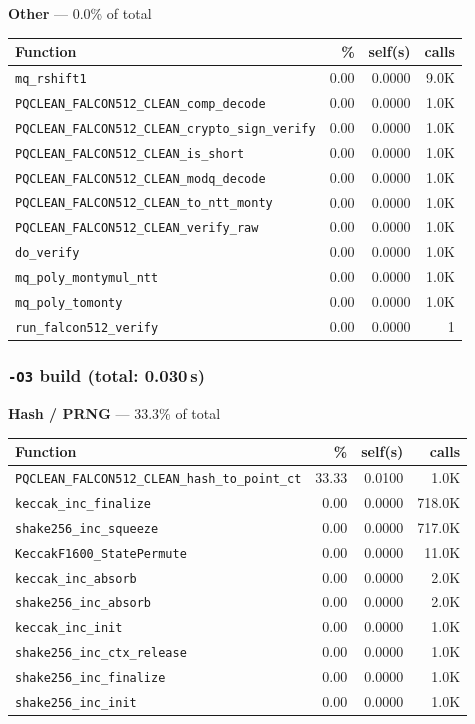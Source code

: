 \documentclass[11pt,a4paper]{article}
\begin{document}
\noindent\colorbox{othercolor}{\strut \textbf{Other} --- 0.0\% of total}
\vspace{2pt}

\begin{longtable}{p{7.5cm}rrr}
\toprule
Function & \% & self(s) & calls \\
\midrule
\endhead
  \texttt{mq\_rshift1} & 0.00 & 0.0000 & 9.0K \\
  \texttt{PQCLEAN\_FALCON512\_CLEAN\_comp\_decode} & 0.00 & 0.0000 & 1.0K \\
  \texttt{PQCLEAN\_FALCON512\_CLEAN\_crypto\_sign\_verify} & 0.00 & 0.0000 & 1.0K \\
  \texttt{PQCLEAN\_FALCON512\_CLEAN\_is\_short} & 0.00 & 0.0000 & 1.0K \\
  \texttt{PQCLEAN\_FALCON512\_CLEAN\_modq\_decode} & 0.00 & 0.0000 & 1.0K \\
  \texttt{PQCLEAN\_FALCON512\_CLEAN\_to\_ntt\_monty} & 0.00 & 0.0000 & 1.0K \\
  \texttt{PQCLEAN\_FALCON512\_CLEAN\_verify\_raw} & 0.00 & 0.0000 & 1.0K \\
  \texttt{do\_verify} & 0.00 & 0.0000 & 1.0K \\
  \texttt{mq\_poly\_montymul\_ntt} & 0.00 & 0.0000 & 1.0K \\
  \texttt{mq\_poly\_tomonty} & 0.00 & 0.0000 & 1.0K \\
  \texttt{run\_falcon512\_verify} & 0.00 & 0.0000 & 1 \\
\bottomrule
\end{longtable}

\subsubsection*{\texttt{-O3} build (total: 0.030\,s)}

\noindent\colorbox{hashcolor}{\strut \textbf{Hash / PRNG} --- 33.3\% of total}
\vspace{2pt}

\begin{longtable}{p{7.5cm}rrr}
\toprule
Function & \% & self(s) & calls \\
\midrule
\endhead
  \texttt{PQCLEAN\_FALCON512\_CLEAN\_hash\_to\_point\_ct} & 33.33 & 0.0100 & 1.0K \\
  \texttt{keccak\_inc\_finalize} & 0.00 & 0.0000 & 718.0K \\
  \texttt{shake256\_inc\_squeeze} & 0.00 & 0.0000 & 717.0K \\
  \texttt{KeccakF1600\_StatePermute} & 0.00 & 0.0000 & 11.0K \\
  \texttt{keccak\_inc\_absorb} & 0.00 & 0.0000 & 2.0K \\
  \texttt{shake256\_inc\_absorb} & 0.00 & 0.0000 & 2.0K \\
  \texttt{keccak\_inc\_init} & 0.00 & 0.0000 & 1.0K \\
  \texttt{shake256\_inc\_ctx\_release} & 0.00 & 0.0000 & 1.0K \\
  \texttt{shake256\_inc\_finalize} & 0.00 & 0.0000 & 1.0K \\
  \texttt{shake256\_inc\_init} & 0.00 & 0.0000 & 1.0K \\
\bottomrule
\end{longtable}
\end{document}
